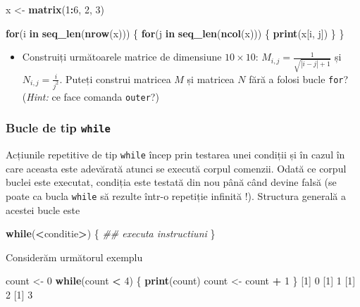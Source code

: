 \documentclass[]{article}
\newenvironment{Shaded}{\begin{snugshade}}{\end{snugshade}}
\newcommand{\CommentTok}[1]{\textcolor[rgb]{0.56,0.35,0.01}{\textit{#1}}}
\newcommand{\ControlFlowTok}[1]{\textcolor[rgb]{0.13,0.29,0.53}{\textbf{#1}}}
\newcommand{\DecValTok}[1]{\textcolor[rgb]{0.00,0.00,0.81}{#1}}
\newcommand{\KeywordTok}[1]{\textcolor[rgb]{0.13,0.29,0.53}{\textbf{#1}}}
\newcommand{\NormalTok}[1]{#1}
\newcommand{\OperatorTok}[1]{\textcolor[rgb]{0.81,0.36,0.00}{\textbf{#1}}}
\newcommand{\StringTok}[1]{\textcolor[rgb]{0.31,0.60,0.02}{#1}}
\newenvironment{frshaded*}{%
  \def\FrameCommand{\fboxrule=\FrameRule\fboxsep=\FrameSep \fcolorbox{framecolor}{shadecolor1}}%
  \MakeFramed {\advance\hsize-\width \FrameRestore}}%
{\endMakeFramed}
\newenvironment{rmdblock}[1]
  {\begin{frshaded*}
  \begin{itemize}
  \renewcommand{\labelitemi}{
    \raisebox{-.7\height}[0pt][0pt]{
      {\setkeys{Gin}{width=2em,keepaspectratio}\texttt{[image: images/icons/\#1]}}
    }
  }
  \item
  }
  {
  \end{itemize}
  \end{frshaded*}
  }
\newcounter{exo}[section]
\newenvironment{rmdexercise}
  {\begin{rmdblock}{exercise}}
  {\end{rmdblock}}
\begin{document}
\begin{Shaded}
\begin{Highlighting}[]
\NormalTok{x <-}\StringTok{ }\KeywordTok{matrix}\NormalTok{(}\DecValTok{1}\OperatorTok{:}\DecValTok{6}\NormalTok{, }\DecValTok{2}\NormalTok{, }\DecValTok{3}\NormalTok{)}

\ControlFlowTok{for}\NormalTok{(i }\ControlFlowTok{in} \KeywordTok{seq_len}\NormalTok{(}\KeywordTok{nrow}\NormalTok{(x))) \{}
        \ControlFlowTok{for}\NormalTok{(j }\ControlFlowTok{in} \KeywordTok{seq_len}\NormalTok{(}\KeywordTok{ncol}\NormalTok{(x))) \{}
                \KeywordTok{print}\NormalTok{(x[i, j])}
\NormalTok{        \}   }
\NormalTok{\}}
\end{Highlighting}
\end{Shaded}

\begin{rmdexercise}
Construiți următoarele matrice de dimensiune \(10 \times 10\):
\(M_{i,j} = \frac{1}{\sqrt{|i-j|+1}}\) și \(N_{i,j} = \frac{i}{j^2}\).
Puteți construi matricea \(M\) și matricea \(N\) fără a folosi bucle
\texttt{for}? (\emph{Hint:} ce face comanda \texttt{outer}?)
\end{rmdexercise}

\hypertarget{bucle-de-tip-while}{%
\subsubsection{\texorpdfstring{Bucle de tip
\texttt{while}}{Bucle de tip while}}\label{bucle-de-tip-while}}

Acțiunile repetitive de tip \texttt{while} încep prin testarea unei
condiții și în cazul în care aceasta este adevărată atunci se execută
corpul comenzii. Odată ce corpul buclei este executat, condiția este
testată din nou până când devine falsă (se poate ca bucla \texttt{while}
să rezulte într-o repetiție infinită !). Structura generală a acestei
bucle este

\begin{Shaded}
\begin{Highlighting}[]
\ControlFlowTok{while}\NormalTok{(}\OperatorTok{<}\NormalTok{conditie}\OperatorTok{>}\NormalTok{) \{}
        \CommentTok{## executa instructiuni}
\NormalTok{\} }
\end{Highlighting}
\end{Shaded}

Considerăm următorul exemplu

\begin{Shaded}
\begin{Highlighting}[]
\NormalTok{count <-}\StringTok{ }\DecValTok{0}
\ControlFlowTok{while}\NormalTok{(count }\OperatorTok{<}\StringTok{ }\DecValTok{4}\NormalTok{) \{}
        \KeywordTok{print}\NormalTok{(count)}
\NormalTok{        count <-}\StringTok{ }\NormalTok{count }\OperatorTok{+}\StringTok{ }\DecValTok{1}
\NormalTok{\}}
\NormalTok{[}\DecValTok{1}\NormalTok{] }\DecValTok{0}
\NormalTok{[}\DecValTok{1}\NormalTok{] }\DecValTok{1}
\NormalTok{[}\DecValTok{1}\NormalTok{] }\DecValTok{2}
\NormalTok{[}\DecValTok{1}\NormalTok{] }\DecValTok{3}
\end{Highlighting}
\end{Shaded}
\end{document}
